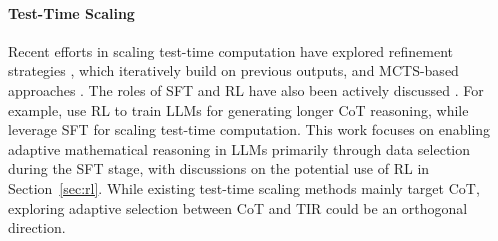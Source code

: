 \paragraph{Test-Time Scaling}
Recent efforts in scaling test-time computation have explored refinement strategies \citep{snell2024refine1, pds2024xu, hou2025refine2, lee2025refine3}, which iteratively build on previous outputs, and MCTS-based approaches \citep{zhou2023mcts1, liu2024mcts2, rebase2024wu}. 
The roles of SFT and RL have also been actively discussed \citep{chu2025sftrl}. 
For example, \citet{o1, deepseekr12025deepseekai} use RL to train LLMs for generating longer CoT reasoning, while \citet{s12025muennighoff, limo2025ye} leverage SFT for scaling test-time computation.
This work focuses on enabling adaptive mathematical reasoning in LLMs primarily through data selection during the SFT stage, with discussions on the potential use of RL in Section~\ref{sec:rl}. 
While existing test-time scaling methods mainly target CoT, exploring adaptive selection between CoT and TIR could be an orthogonal direction.


 